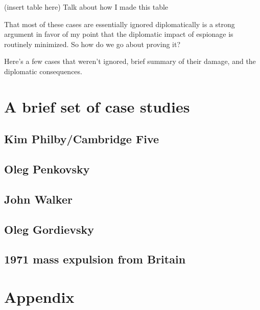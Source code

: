 \documentclass[12pt]{article}
\begin{document}
(insert table here) Talk about how I made this table

That most of these cases are essentially ignored diplomatically is a strong argument in favor of my point that the diplomatic impact of espionage is routinely minimized. So how do we go about proving it?

Here's a few cases that weren't ignored, brief summary of their damage, and the diplomatic consequences.

\section{A brief set of case studies}
\subsection{Kim Philby/Cambridge Five}
\subsection{Oleg Penkovsky}
\subsection{John Walker}
\subsection{Oleg Gordievsky}
\subsection{1971 mass expulsion from Britain}

\section{Appendix}
\end{document}
